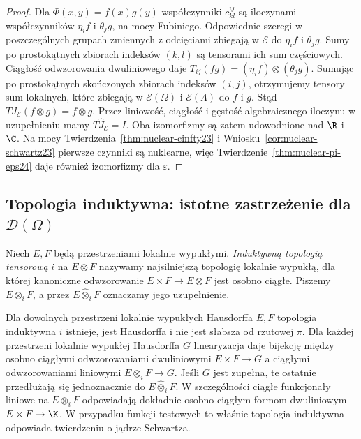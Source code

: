 \begin{proof}
Dla $\Phi(x,y)=f(x)g(y)$ współczynniki $c_{kl}^{ij}$
są iloczynami współczynników $\eta_i f$ i $\theta_j g$,
na mocy Fubiniego. Odpowiednie szeregi w poszczególnych grupach zmiennych
z odcięciami zbiegają w $\mathcal E$
do $\eta_i f$ i $\theta_j g$. Sumy po prostokątnych
zbiorach indeksów $(k,l)$ są tensorami ich sum
częściowych. Ciągłość odwzorowania dwuliniowego
daje $T_{ij}(fg)=(\eta_i f)\otimes(\theta_j g)$.
Sumując po prostokątnych skończonych zbiorach
indeksów $(i,j)$, otrzymujemy tensory sum lokalnych,
które zbiegają w $\mathcal E(\Omega)$ i
$\mathcal E(\Lambda)$ do $f$ i $g$.
Stąd $T J_{\mathcal E}(f\otimes g)=f\otimes g$.
Przez liniowość, ciągłość i gęstość algebraicznego
iloczynu w uzupełnieniu mamy $T\widehat J_{\mathcal E}=I$.
Oba izomorfizmy są zatem udowodnione nad $\R$ i $\C$.
Na mocy Twierdzenia~\ref{thm:nuclear-cinfty23}
i Wniosku~\ref{cor:nuclear-schwartz23} pierwsze
czynniki są nuklearne, więc
Twierdzenie~\ref{thm:nuclear-pi-eps24}
daje również izomorfizmy dla $\varepsilon$.
\end{proof}

\subsection{Topologia induktywna: istotne zastrzeżenie dla \texorpdfstring{$\mathcal D(\Omega)$}{D(Omega)}}

\begin{definicja}
\label{def:i-topology24}
Niech $E,F$ będą przestrzeniami lokalnie wypukłymi.
\emph{Induktywną topologią tensorową} $i$ na $E\otimes F$
nazywamy najsilniejszą topologię lokalnie wypukłą,
dla której kanoniczne odwzorowanie
$E\times F\to E\otimes F$ jest osobno ciągłe.
Piszemy $E\otimes_i F$, a przez
$E\widehat\otimes_i F$ oznaczamy jego uzupełnienie.
\end{definicja}

\begin{stwierdzenie}
\label{prop:i-vs-pi24}
Dla dowolnych przestrzeni lokalnie wypukłych Hausdorffa
$E,F$ topologia induktywna $i$ istnieje, jest Hausdorffa
i nie jest słabsza od rzutowej $\pi$.
Dla każdej przestrzeni lokalnie wypukłej Hausdorffa $G$
linearyzacja daje bijekcję między osobno ciągłymi
odwzorowaniami dwuliniowymi $E\times F\to G$
a ciągłymi odwzorowaniami liniowymi $E\otimes_i F\to G$.
Jeśli $G$ jest zupełna, te ostatnie przedłużają się
jednoznacznie do $E\widehat\otimes_i F$.
W szczególności ciągłe funkcjonały liniowe na
$E\otimes_i F$ odpowiadają dokładnie osobno ciągłym
formom dwuliniowym $E\times F\to\K$. W przypadku
funkcji testowych to właśnie topologia induktywna
odpowiada twierdzeniu o jądrze Schwartza.
\end{stwierdzenie}


